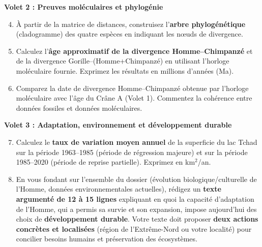 \documentclass[11pt]{article}
\begin{document}
\textbf{Volet 2 : Preuves moléculaires et phylogénie}
\begin{enumerate}\setcounter{enumi}{3}
    \item À partir de la matrice de distances, construisez l'\textbf{arbre phylogénétique} (cladogramme) des quatre espèces en indiquant les nœuds de divergence.
    \item Calculez l'\textbf{âge approximatif de la divergence Homme--Chimpanzé} et de la divergence Gorille--(Homme+Chimpanzé) en utilisant l'horloge moléculaire fournie. Exprimez les résultats en millions d'années (Ma).
    \item Comparez la date de divergence Homme--Chimpanzé obtenue par l'horloge moléculaire avec l'âge du Crâne A (Volet 1). Commentez la cohérence entre données fossiles et données moléculaires.
\end{enumerate}

\textbf{Volet 3 : Adaptation, environnement et développement durable}
\begin{enumerate}\setcounter{enumi}{6}
    \item Calculez le \textbf{taux de variation moyen annuel} de la superficie du lac Tchad sur la période 1963--1985 (période de régression majeure) et sur la période 1985--2020 (période de reprise partielle). Exprimez en km$^2$/an.
    \item En vous fondant sur l'ensemble du dossier (évolution biologique/culturelle de l'Homme, données environnementales actuelles), rédigez un \textbf{texte argumenté de 12 à 15 lignes} expliquant en quoi la capacité d'adaptation de l'Homme, qui a permis sa survie et son expansion, impose aujourd'hui des choix de \textbf{développement durable}. Votre texte doit proposer \textbf{deux actions concrètes et localisées} (région de l'Extrême-Nord ou votre localité) pour concilier besoins humains et préservation des écosystèmes.
\end{enumerate}
\end{document}
